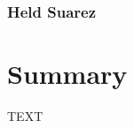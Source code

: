 \documentclass[journal abbreviation, manuscript]{copernicus}
\begin{document}
\subsubsection{Held Suarez}

\section{Summary}
\label{sec: summary}


\conclusions  %
TEXT












\appendix
\section{}    %

\subsection{}     %


\noappendix       %


\end{document}
